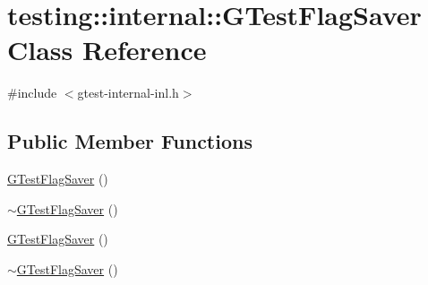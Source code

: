 \hypertarget{classtesting_1_1internal_1_1_g_test_flag_saver}{\section{testing\-:\-:internal\-:\-:G\-Test\-Flag\-Saver Class Reference}
\label{classtesting_1_1internal_1_1_g_test_flag_saver}
}


{\ttfamily \#include $<$gtest-\/internal-\/inl.\-h$>$}

\subsection*{Public Member Functions}
\begin{DoxyCompactItemize}
\item 
\hyperlink{classtesting_1_1internal_1_1_g_test_flag_saver_ad94262f7765927bbe9a08e25f9c67530}{G\-Test\-Flag\-Saver} ()
\item 
\hyperlink{classtesting_1_1internal_1_1_g_test_flag_saver_a5f00786b5c9045fd5dd7c42fd7dd1476}{$\sim$\-G\-Test\-Flag\-Saver} ()
\item 
\hyperlink{classtesting_1_1internal_1_1_g_test_flag_saver_ad94262f7765927bbe9a08e25f9c67530}{G\-Test\-Flag\-Saver} ()
\item 
\hyperlink{classtesting_1_1internal_1_1_g_test_flag_saver_a5f00786b5c9045fd5dd7c42fd7dd1476}{$\sim$\-G\-Test\-Flag\-Saver} ()
\end{DoxyCompactItemize}


